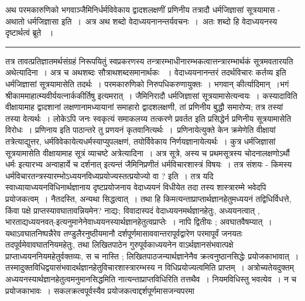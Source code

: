 \documentclass[11pt, openany]{book}
\makeatletter
\def\blfootnote{\gdef\@thefnmark{}\@footnotetext}
\makeatother
\begin{document}
{\bl
अथ परमकारुणिको भगवाञ्जैमिनिर्धर्मविवेकाय द्वादशलक्षणीं प्रणिनीय तत्रादौ धर्मजिज्ञासां सूत्रयामास - {\al अथातो धर्मजिज्ञासा} इति~।~अत्र {\al अथ} शब्दो
वेदाध्ययनानन्तर्यवचनः~।~{\al अतः} शब्दो हि वेदाध्ययनस्य दृष्टार्थत्वं ब्रूते
~।}\\
\hrule
\vspace{3mm}
तत्र तावत्प्रतिज्ञातमर्थसंग्रहं निरूपयितुं स्वप्रकरणस्य तन्त्रारम्भाधीनारम्भकत्वात्तन्त्रारम्भार्थकं सूत्रमवतारयति {\br अथेत्यादिना~।} अत्र च {\qt अथ}शब्दः सौत्राथशब्दसमानार्थकः ~। वेदाध्ययनानन्तरं तदर्थविचारः कर्तव्य इति धर्मजिज्ञासां सूत्रयामासेति तदर्थः~। परमकारुणिको निरुपधिकरुणायुक्तः~। भगवान् कीर्त्यादिमान्~।{\qt भगं श्रीकाममाहात्म्यवीर्ययत्नार्ककीर्तिषु} इत्यमरात्~। जैमिनिरादौ धर्मजिज्ञासां सूत्रयामासेत्यन्वयः~। कस्यादाविति वीक्षायामाह द्वादशानां लक्षणानामध्यायानां समाहारो द्वादशलक्षणी, तां प्रणिनीय बुद्धौ समारोप्य; तत्र तस्यां तस्या वेत्यर्थः~। लोकेऽपि जनः स्वकृत्यं समाकलय्य तत्करणे प्रवर्तत इति प्रसिद्धेर्न प्रणिनीय सूत्रयामासेति विरोधः~। {\qt  प्रणिनाय} इति पाठान्तरे तु प्रणयनं कृतवानित्यर्थः~।~प्रणिनायेत्युक्ते केन क्रमेणेति वीक्षायां
तत्रेत्याद्युत्तर, धर्मविवेकायेत्यधर्मस्याप्युपलक्षणं, तयोर्विवेकाय निर्णयज्ञानायेत्यर्थः~। कुत्र धर्मजिज्ञासां सूत्रयामासेति वीक्षायामाह सूत्रं व्याचष्टे {\br अत्रेत्यादिना~।} अत्र सूत्रे, अस्य च प्रथमसूत्रस्य {\qt चोदनालक्षणोऽर्थौ धर्मः} इत्यारभ्य {\qt अन्वाहार्ये च दर्शनात्} इत्यन्तं जैमिनिप्रणीतं धर्मविचारशास्त्रं  विषयः~।
तत्र संशयः - किमस्य धर्मविचारतन्त्रस्यारम्भोऽध्ययनविध्यप्रयोज्यस्तत्प्रयोज्यो वा ? इति~। तत्र यदि स्वाध्यायाध्ययनविधिनार्थज्ञानाय दृष्टप्रयोजनाय वेदाध्ययनं विधीयेत तदा तस्य शास्त्रारम्मे भवेदपि प्रयोजकत्वम्~। नैतदस्ति, अन्यथा सिद्धत्वात्~। तथा हि किमत्यन्ताप्राप्तार्थज्ञानहेतुमध्ययनं तद्विधिर्विधत्ते, किंवा पक्षे प्राप्तस्यावघातावन्नि\blfootnote{पाठा०\textemdash\ $^{१}${\qt नियामक (?)}.}\footnotemark यमेन? नाद्यः; विवादास्पदं वेदाध्ययनमर्थज्ञानहेतुः, अध्ययनत्वात् ,
भारताद्यध्ययनवत्-इत्यनुमानेनेवाध्ययनस्यार्थज्ञानहेतुत्वप्राप्तेः~।
\newpage
\noindent
नापि द्वितीयः ; अवघातवैषम्यात्~। यथाऽवघातनिष्पन्नैरेव तण्डुलैरनुष्ठीयमानौ दर्शपूर्णमासाववान्तरापूर्वद्वारेण परमापूर्वं जनयतः तदपूर्वमेवावघातनियमहेतुः, तथा लिखितपाठेन गुरुपूर्वकाध्ययनेन वाऽर्थज्ञानसंभवात्पक्षे प्राप्ताध्ययननियमहेतुर्वक्तव्यः, स च नास्ति ; लिखितपाठजन्यार्थज्ञानेनैव क्रत्वनुष्ठानसिद्धेः प्रयोजकाभावात्~। तस्मादुक्तविधिद्वयासंभवादर्थज्ञानहेतुविचारशास्त्रारम्भस्य न विधिप्रयोज्यत्वमिति प्राप्तम्~। अत्रोच्यते\textendash यदुक्तम् अध्ययनस्यार्थज्ञानहेतुत्वमनुमानसिद्धमिति नात्यन्ताप्राप्तविधिरिति तत्तथैव~। नियमविधिस्तु भवत्येव~। न च प्रयोजकाभावः~। सकलक्रत्वपूर्वस्यैव प्रयोजकत्वाद्दर्शपूर्णमासजन्यपरमा\textendash
\end{document}

